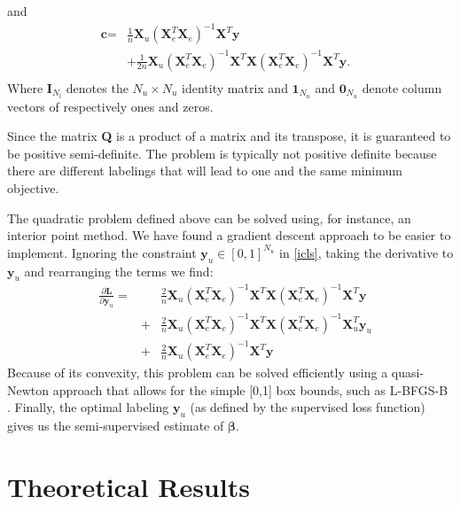 \documentclass[smallcondensed]{svjour3}
\newcommand{\Xe}{\mathbf{X}_e  }
\newcommand{\G}{\left(\Xe^T \Xe \right)^{-1}}
\begin{document}
and
\begin{equation}
\begin{aligned}
\textbf{c} = & \frac{1}{n}  \textbf{X}_u \G \textbf{X}^T  \textbf{y} & \\
& + \frac{1}{2 n} \textbf{X}_u \G \textbf{X}^T \textbf{X} \G \textbf{X}^T \textbf{y}. &\\
\end{aligned} \nonumber
\end{equation}
Where $\textbf{I}_{N_l}$ denotes the $N_u \times N_u$ identity matrix and $\textbf{1}_{N_u}$ and $\textbf{0}_{N_u}$ denote column vectors of respectively ones and zeros.

Since the matrix \textbf{Q} is a product of a matrix and its transpose, it is guaranteed to be positive semi-definite. The problem is typically not positive definite because there are different labelings that will lead to one and the same minimum objective. 

The quadratic problem defined above can be solved using, for instance, an interior point method. We have found a gradient descent approach to be easier to implement. Ignoring the constraint $\textbf{y}_u \in [0,1]^{N_u}$ in \eqref{icls}, taking the derivative to $\textbf{y}_u$ and rearranging the terms we find: 
\begin{equation}
\begin{aligned}
&\frac { \partial \textbf{L} }{ \partial \textbf{y}_u } = & & \frac{2}{n}  \textbf{X}_u \G \textbf{X}^T \textbf{X} \G \textbf{X}^T \textbf{y}  \\
& & + & \frac{2}{n}  \textbf{X}_u \G \textbf{X}^T  \textbf{X}  \G  \textbf{X}_u^T \textbf{y}_u  \\
& & + & \frac{2}{n}  \textbf{X}_u \G \textbf{X}^T  \textbf{y}
\end{aligned}
\end{equation}
Because of its convexity, this problem can be solved efficiently using a quasi-Newton approach that allows for the simple [0,1] box bounds, such as L-BFGS-B \cite{Byrd1995}. Finally, the optimal labeling $\textbf{y}_u$ (as defined by the supervised loss function) gives us the semi-supervised estimate of $\boldsymbol{\beta}$.


\section{Theoretical Results}
\end{document}
